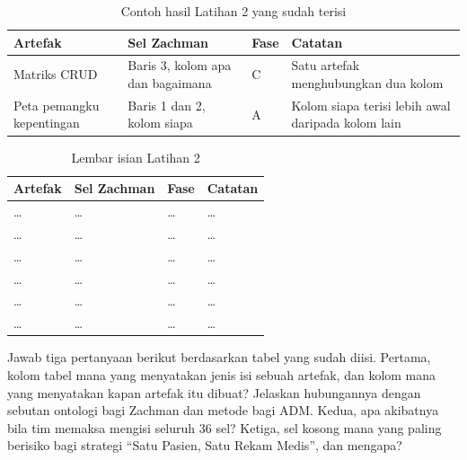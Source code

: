 \begin{table}[!htb]
  \centering
  \caption{Contoh hasil Latihan 2 yang sudah terisi}
  \label{tab:ch02-lat2-contoh}
  {\footnotesize
  \begin{tabularx}{\textwidth}{>{\raggedright\arraybackslash}p{2.8cm}
                               >{\raggedright\arraybackslash}p{3.2cm}
                               >{\raggedright\arraybackslash}p{1.0cm}
                               >{\raggedright\arraybackslash}X}
    \hline
    \textbf{Artefak} & \textbf{Sel Zachman} & \textbf{Fase} & \textbf{Catatan} \\
    \hline
    Matriks CRUD & Baris 3, kolom apa dan bagaimana & C & Satu artefak menghubungkan dua kolom \\
    \hline
    Peta pemangku kepentingan & Baris 1 dan 2, kolom siapa & A & Kolom siapa terisi lebih awal daripada kolom lain \\
    \hline
  \end{tabularx}}
\end{table}

\begin{table}[!htb]
  \centering
  \caption{Lembar isian Latihan 2}
  \label{tab:ch02-lat2-hasil}
  {\footnotesize
  \begin{tabularx}{\textwidth}{>{\raggedright\arraybackslash}p{2.8cm}
                               >{\raggedright\arraybackslash}p{3.2cm}
                               >{\raggedright\arraybackslash}p{1.0cm}
                               >{\raggedright\arraybackslash}X}
    \hline
    \textbf{Artefak} & \textbf{Sel Zachman} & \textbf{Fase} & \textbf{Catatan} \\
    \hline
    \dots & \dots & \dots & \dots \\
    \hline
    \dots & \dots & \dots & \dots \\
    \hline
    \dots & \dots & \dots & \dots \\
    \hline
    \dots & \dots & \dots & \dots \\
    \hline
    \dots & \dots & \dots & \dots \\
    \hline
    \dots & \dots & \dots & \dots \\
    \hline
  \end{tabularx}}
\end{table}

Jawab tiga pertanyaan berikut berdasarkan tabel yang sudah diisi. Pertama,
kolom tabel mana yang menyatakan jenis isi sebuah artefak, dan kolom mana yang
menyatakan kapan artefak itu dibuat? Jelaskan hubungannya dengan sebutan
ontologi bagi Zachman dan metode bagi ADM. Kedua, apa akibatnya bila tim
memaksa mengisi seluruh 36 sel? Ketiga, sel kosong mana yang paling berisiko
bagi strategi ``Satu Pasien, Satu Rekam Medis'', dan mengapa?

